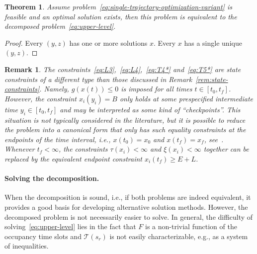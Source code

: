 \documentclass[a4paper]{report}
\theoremstyle{definition}
\theoremstyle{plain}
\newtheorem{theorem}{Theorem}[chapter]
\newtheorem{remark}{Remark}[chapter]
\newcommand\note[1]{{\color{Navy}#1}}
\begin{document}
\begin{theorem}
  \note{ Assume problem~\eqref{eq:single-trajectory-optimization-variant} is
    feasible and an optimal solution exists, then this problem is equivalent to
    the decomposed problem~\eqref{eq:upper-level}.}
\end{theorem}
\begin{proof}
  \note{
  Every $(y,z)$ has one or more solutions $x$.
  Every $x$ has a single unique $(y,z)$.}
\end{proof}

\begin{remark}
  The constraints~\eqref{eq:L3},~\eqref{eq:L4},~\eqref{eq:T4*}
  and~\eqref{eq:T5*} are state constraints of a different type than those
  discussed in Remark~\ref{rem:state-constraints}. Namely, $g(x(t)) \leq 0$ is
  imposed for all times $t \in [t_{0}, t_{f}]$.
  However, the constraint $x_{i}(y_{i}) = B$ only holds at some prespecified
  intermediate time $y_{i} \in [t_{0}, t_{f}]$ and may be interpreted as some
  kind of ``checkpoints''.
  This situation is not typically considered in the literature, but it is
  possible to reduce the problem into a canonical form that only has such
  equality constraints at the endpoints of the time interval, i.e.,
  $x(t_{0}) = x_{0}$ and $x(t_{f}) = x_{f}$,
  see~\cite{dmitrukMaximumPrincipleOptimal2011}.
  Whenever $t_{f} < \infty$, the constraints $\tau(x_{i}) < \infty$ and
  $\xi(x_{i}) < \infty$ together can be replaced by the equivalent endpoint
  constraint $x_{i}(t_{f}) \geq E + L$.
\end{remark}


\paragraph{Solving the decomposition.}

When the decomposition is sound, i.e., if both problems are indeed equivalent,
it provides a good basis for developing alternative solution methods. However,
the decomposed problem is not necessarily easier to solve.
%
In general, the difficulty of solving~\eqref{eq:upper-level} lies in the fact
that $F$ is a non-trivial function of the occupancy time slots and
$\mathcal{T}(s_{r})$ is not easily characterizable, e.g., as a system of
inequalities.
\end{document}
